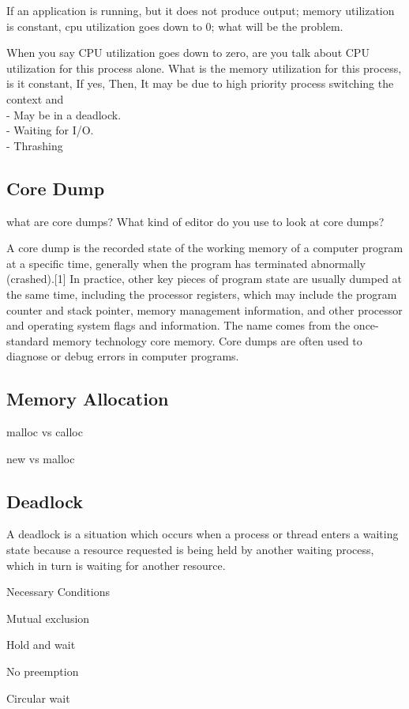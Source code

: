 If an application is running, but it does not produce output; memory utilization is constant, cpu utilization goes down to 0; what will be the problem.

When you say CPU utilization goes down to zero, are you talk about CPU utilization for this process alone. What is the memory utilization for this process, is it constant, If yes, 
Then, It may be due to high priority process switching the context and \\
- May be in a deadlock.\\
- Waiting for I/O. \\
- Thrashing

\subsection{Core Dump}
what are core dumps? What kind of editor do you use to look at core dumps?

A core dump is the recorded state of the working memory of a computer program at a specific time, generally when the program has terminated abnormally (crashed).[1] In practice, 
other key pieces of program state are usually dumped at the same time, including the processor registers, which may include the program counter and stack pointer, memory 
management information, and other processor and operating system flags and information. The name comes from the once-standard memory technology core memory. Core dumps are often 
used to diagnose or debug errors in computer programs.

\subsection{Memory Allocation}
malloc vs calloc

new vs malloc

\subsection{Deadlock}
A deadlock is a situation which occurs when a process or thread enters a waiting state because a resource requested is being held by another waiting process, 
which in turn is waiting for another resource.

Necessary Conditions
\begindot
\item Mutual exclusion
\item Hold and wait
\item No preemption
\item Circular wait
\myenddot

